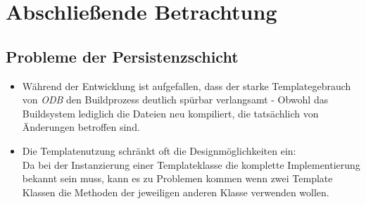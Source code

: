 \section{Abschließende Betrachtung}
\label{sec:abschluss}

\subsection{Probleme der Persistenzschicht}
\begin{itemize}
	\item Während der Entwicklung ist aufgefallen, dass der starke Templategebrauch von \textit{ODB} den Buildprozess deutlich spürbar verlangsamt - Obwohl das Buildsystem lediglich die Dateien neu kompiliert, die tatsächlich von Änderungen betroffen sind.\\
	\item Die Templatenutzung schränkt oft die Designmöglichkeiten ein:\\
		Da bei der Instanzierung einer Templateklasse die komplette Implementierung bekannt sein muss,
		kann es zu Problemen kommen wenn zwei Template Klassen die Methoden der jeweiligen anderen Klasse verwenden wollen.
\end{itemize}
